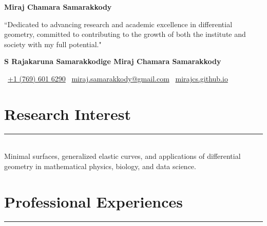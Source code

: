 \documentclass[12pt]{book}
\begin{document}
\pagestyle{fancy}
\thispagestyle{empty}
\begin{center}
\textbf{\Huge{Miraj Chamara Samarakkody}}\\
\end{center}

``Dedicated to advancing research and academic excellence in differential geometry, committed to contributing to the growth of both the institute and society with my full potential."

\begin{center}
\textbf{S Rajakaruna Samarakkodige Miraj Chamara Samarakkody}
\end{center}
  \faPhone\ \href{tel:+17696016290}{+1 (769) 601 6290} \hfill \faEnvelope\  \href{mailto:miraj.samarakkody@gmail.com}{miraj.samarakkody@gmail.com} \hfill \faGlobe\ \href{https://mirajcs.github.io/}{mirajcs.github.io}\\

\section*{Research Interest} \rule{\textwidth}{1pt}\\

Minimal surfaces, generalized elastic curves, and applications of differential geometry in mathematical physics, biology, and data science.\\

\section*{Professional Experiences} \rule{\textwidth}{1pt}\\
\end{document}
